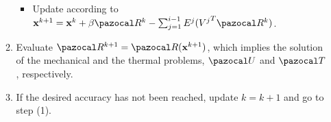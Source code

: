 \begin{framedbox}[htb]
\begin{center}
\begin{minipage}{0.9\textwidth}
\begin{enumerate}[(i)]
\begin{enumerate}[(1)]
\begin{itemize}
        \item Update according to \(\mathbf x^{k+1} = \mathbf x^k + \beta \pazocal R^k - \sum_{j=1}^{i-1} E^j ({V^j}^T\pazocal R^k)\).
      \end{itemize}
       \item Evaluate \(\pazocal R^{k+1} = \pazocal R(\mathbf x^{k+1})\), which implies the solution of the mechanical and the thermal problems, \(\pazocal U\) and \(\pazocal T\), respectively.
       \item If the desired accuracy has not been reached, update \(k=k+1\) and go to step (1).
     \end{enumerate}
     \end{enumerate}
     \end{minipage}
   \end{center}
\end{framedbox}

